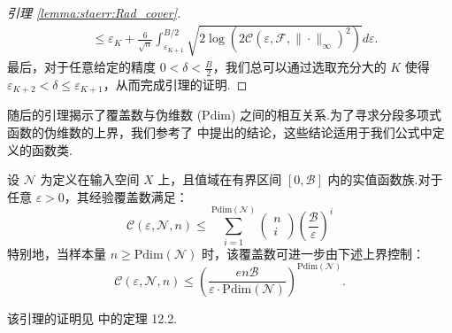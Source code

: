 \begin{proof}[引理 \ref{lemma:staerr:Rad_cover}]
\begin{equation*}
\begin{aligned}
&\leq \varepsilon_{K}+\frac{6}{\sqrt{n}} \int_{\varepsilon_{K+1}}^{B / 2} \sqrt{2 \log \left(2 \mathcal{C}\left(\varepsilon, \mathcal{F},\|\cdot\|_{\infty}\right)^{2}\right)} d \varepsilon.
\end{aligned}
\end{equation*}
最后，对于任意给定的精度 $0<\delta<\frac{B}{2}$，我们总可以通过选取充分大的 $K$ 使得 $\varepsilon_{K+2}<\delta \leq \varepsilon_{K+1}$，从而完成引理的证明.
\end{proof}




随后的引理揭示了覆盖数与伪维数 (Pdim) 之间的相互关系.为了寻求分段多项式函数的伪维数的上界，我们参考了 \cite{bartlett2019nearly} 中提出的结论，这些结论适用于我们公式中定义的函数类.

\begin{lemma}\label{lemma:staerr:cover_Pdim}
设 $\mathcal{N}$ 为定义在输入空间 $X$ 上，且值域在有界区间 $[0, \mathcal{B}]$ 内的实值函数族.对于任意 $\varepsilon>0$，其经验覆盖数满足：
\begin{equation*}
\mathcal{C}(\varepsilon, \mathcal{N}, n) \leq \sum_{i=1}^{\mathrm{Pdim}(\mathcal{N})}
\begin{pmatrix}
n \\
i
\end{pmatrix}
\left(\frac{\mathcal{B}}{\varepsilon}\right)^{i}
\end{equation*}
特别地，当样本量 $n\geq\mathrm{Pdim}(\mathcal{N})$ 时，该覆盖数可进一步由下述上界控制：
$$\mathcal{C}(\varepsilon, \mathcal{N}, n) \leq \left(\frac{en\mathcal{B}}{\varepsilon\cdot\mathrm{Pdim}(\mathcal{N})}\right)^{\mathrm{Pdim}(\mathcal{N})}.$$
\end{lemma}
该引理的证明见 \cite{anthony2009neural} 中的定理 12.2.

